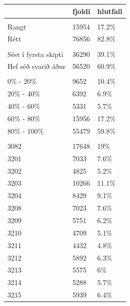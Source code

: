 \documentclass[
  12pt,
]{article}
\begin{document}
\begin{longtable}{>{\raggedright\arraybackslash}p{4cm}ll}
\toprule
  & fjoldi & hlutfall\\
\midrule
\addlinespace[0.3em]
\multicolumn{3}{l}{\textbf{correct}}\\
\hspace{1em}Rangt & 15954 & 17.2\%\\
\hspace{1em}Rétt & 76856 & 82.8\%\\
\addlinespace[0.3em]
\multicolumn{3}{l}{\textbf{hsta}}\\
\hspace{1em}Sést í fyrsta skipti & 36290 & 39.1\%\\
\hspace{1em}Hef séð svarið áður & 56520 & 60.9\%\\
\addlinespace[0.3em]
\multicolumn{3}{l}{\textbf{hluta2}}\\
\hspace{1em}0\% - 20\% & 9652 & 10.4\%\\
\hspace{1em}20\% - 40\% & 6392 & 6.9\%\\
\hspace{1em}40\% - 60\% & 5331 & 5.7\%\\
\hspace{1em}60\% - 80\% & 15956 & 17.2\%\\
\hspace{1em}80\% - 100\% & 55479 & 59.8\%\\
\addlinespace[0.3em]
\multicolumn{3}{l}{\textbf{lectureId}}\\
\hspace{1em}3082 & 17648 & 19\%\\
\hspace{1em}3201 & 7033 & 7.6\%\\
\hspace{1em}3202 & 4825 & 5.2\%\\
\hspace{1em}3203 & 10266 & 11.1\%\\
\hspace{1em}3204 & 8429 & 9.1\%\\
\hspace{1em}3208 & 7023 & 7.6\%\\
\hspace{1em}3209 & 5751 & 6.2\%\\
\hspace{1em}3210 & 4709 & 5.1\%\\
\hspace{1em}3211 & 4432 & 4.8\%\\
\hspace{1em}3212 & 5892 & 6.3\%\\
\hspace{1em}3213 & 5575 & 6\%\\
\hspace{1em}3214 & 5288 & 5.7\%\\
\hspace{1em}3215 & 5939 & 6.4\%\\
\bottomrule
\end{longtable}
\end{document}

